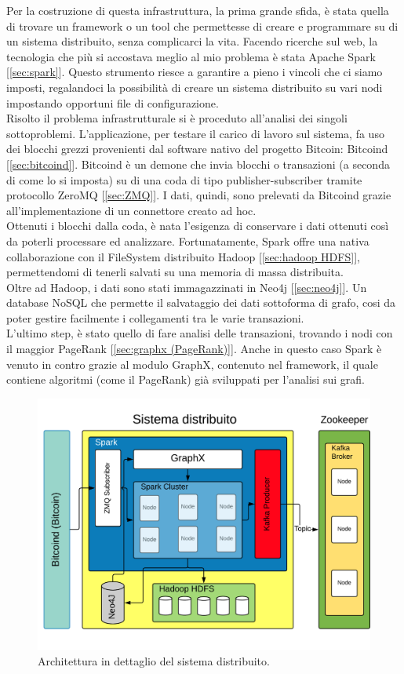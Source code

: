 Per la costruzione di questa infrastruttura, la prima grande sfida, è stata quella di trovare un framework o un tool che permettesse di creare e programmare su di un sistema distribuito, senza complicarci la vita. Facendo ricerche sul web, la tecnologia che più si accostava meglio al mio problema è stata Apache Spark [\ref{sec:spark}]. Questo strumento riesce a garantire a pieno i vincoli che ci siamo imposti, regalandoci la possibilità di creare un sistema distribuito su vari nodi impostando opportuni file di configurazione.
\\Risolto il problema infrastrutturale si è proceduto all'analisi dei singoli sottoproblemi. L'applicazione, per testare il carico di lavoro sul sistema, fa uso dei blocchi grezzi provenienti dal software nativo del progetto Bitcoin: Bitcoind [\ref{sec:bitcoind}]. Bitcoind è un demone che invia blocchi o transazioni (a seconda di come lo si imposta) su di una coda di tipo publisher-subscriber tramite protocollo ZeroMQ [\ref{sec:ZMQ}]. I dati, quindi, sono prelevati da Bitcoind grazie all'implementazione di un connettore creato ad hoc.
\\Ottenuti i blocchi dalla coda, è nata l'esigenza di conservare i dati ottenuti così da poterli processare ed analizzare. Fortunatamente, Spark offre una nativa collaborazione con il FileSystem distribuito Hadoop [\ref{sec:hadoop HDFS}], permettendomi di tenerli salvati su una memoria di massa distribuita.
\\Oltre ad Hadoop, i dati sono stati immagazzinati in Neo4j [\ref{sec:neo4j}]. Un database NoSQL che permette il salvataggio dei dati sottoforma di grafo, cosi da poter gestire facilmente i collegamenti tra le varie transazioni.
\\L'ultimo step, è stato quello di fare analisi delle transazioni, trovando i nodi con il maggior PageRank [\ref{sec:graphx (PageRank)}]. Anche in questo caso Spark è venuto in contro grazie al modulo GraphX, contenuto nel framework, il quale contiene algoritmi (come il PageRank) già sviluppati per l'analisi sui grafi.
\begin{figure}[H]
	\centering
	\includegraphics[width=\textwidth]{images/sistemaDistribuito.png}
	\caption{Architettura in dettaglio del sistema distribuito.}
	\label{fig:distribuitedSystemArchitetture}
\end{figure}  
